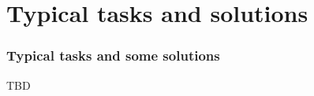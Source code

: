 \section{Typical tasks and solutions}


\begin{frame}
  \frametitle{Typical tasks and some solutions}

  TBD
\end{frame}
